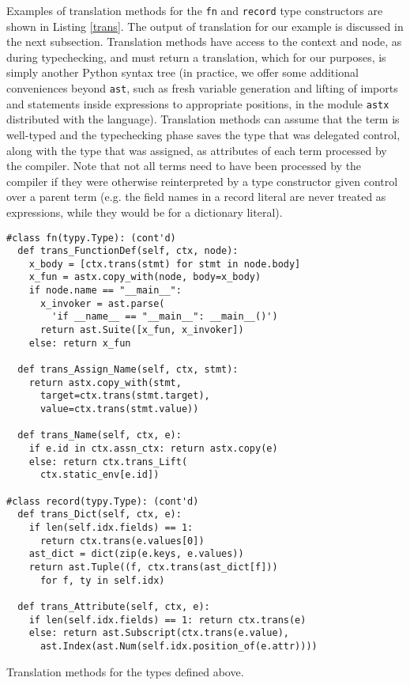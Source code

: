 \documentclass{sigplanconf}
\newcommand{\lip}[1]{\lstinline[language=Python,basicstyle=\ttfamily\small,deletendkeywords={tuple,buffer,map}]{#1}}
\begin{document}
Examples of translation methods for the \lip{fn} and \lip{record} type constructors are shown in Listing \ref{trans}. The output of translation for our example is discussed in the next subsection. Translation methods have access to the context and node, as during typechecking, and must return a translation, which for our purposes, is simply another Python syntax tree (in practice, we offer some additional conveniences beyond \lip{ast}, such as fresh variable generation and lifting of imports and statements inside expressions to appropriate positions, in the module \lip{astx} distributed with the language). Translation methods can assume that the term is well-typed and the typechecking phase saves the type that was delegated control, along with the type that was assigned, as attributes of each term processed by the compiler. Note that not all terms need to have been processed by the compiler if they were otherwise reinterpreted by a type constructor given control over a parent term (e.g. the field names in a record literal are never treated as expressions, while they would be for a dictionary literal). %
\begin{codelisting}[t]
\begin{lstlisting}
#class fn(typy.Type): (cont'd)
  def trans_FunctionDef(self, ctx, node):
    x_body = [ctx.trans(stmt) for stmt in node.body]
    x_fun = astx.copy_with(node, body=x_body)
    if node.name == "__main__": 
      x_invoker = ast.parse(
        'if __name__ == "__main__": __main__()')
      return ast.Suite([x_fun, x_invoker])
    else: return x_fun
  
  def trans_Assign_Name(self, ctx, stmt):
    return astx.copy_with(stmt, 
      target=ctx.trans(stmt.target), 
      value=ctx.trans(stmt.value))
    
  def trans_Name(self, ctx, e):
    if e.id in ctx.assn_ctx: return astx.copy(e)
    else: return ctx.trans_Lift(
      ctx.static_env[e.id])
    
#class record(typy.Type): (cont'd)
  def trans_Dict(self, ctx, e): 
    if len(self.idx.fields) == 1: 
      return ctx.trans(e.values[0])
    ast_dict = dict(zip(e.keys, e.values))
    return ast.Tuple((f, ctx.trans(ast_dict[f]))
      for f, ty in self.idx)

  def trans_Attribute(self, ctx, e):
    if len(self.idx.fields) == 1: return ctx.trans(e)
    else: return ast.Subscript(ctx.trans(e.value), 
      ast.Index(ast.Num(self.idx.position_of(e.attr))))
\end{lstlisting}
\caption{Translation methods for the types defined above.}
\label{trans}
\end{codelisting}
\end{document}
